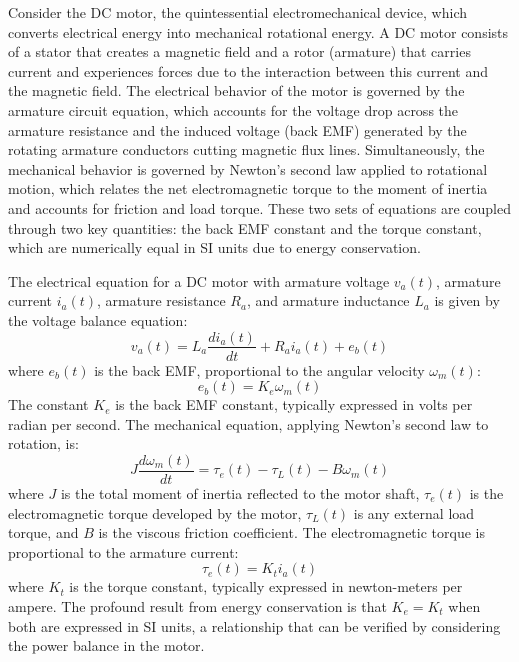 Consider the DC motor, the quintessential electromechanical device, which converts electrical energy into mechanical rotational energy. A DC motor consists of a stator that creates a magnetic field and a rotor (armature) that carries current and experiences forces due to the interaction between this current and the magnetic field. The electrical behavior of the motor is governed by the armature circuit equation, which accounts for the voltage drop across the armature resistance and the induced voltage (back EMF) generated by the rotating armature conductors cutting magnetic flux lines. Simultaneously, the mechanical behavior is governed by Newton's second law applied to rotational motion, which relates the net electromagnetic torque to the moment of inertia and accounts for friction and load torque. These two sets of equations are coupled through two key quantities: the back EMF constant and the torque constant, which are numerically equal in SI units due to energy conservation.

The electrical equation for a DC motor with armature voltage $v_a(t)$, armature current $i_a(t)$, armature resistance $R_a$, and armature inductance $L_a$ is given by the voltage balance equation:
\begin{equation}
v_a(t) = L_a \frac{di_a(t)}{dt} + R_a i_a(t) + e_b(t)
\end{equation}
where $e_b(t)$ is the back EMF, proportional to the angular velocity $\omega_m(t)$:
\begin{equation}
e_b(t) = K_e \omega_m(t)
\end{equation}
The constant $K_e$ is the back EMF constant, typically expressed in volts per radian per second. The mechanical equation, applying Newton's second law to rotation, is:
\begin{equation}
J \frac{d\omega_m(t)}{dt} = \tau_e(t) - \tau_L(t) - B \omega_m(t)
\end{equation}
where $J$ is the total moment of inertia reflected to the motor shaft, $\tau_e(t)$ is the electromagnetic torque developed by the motor, $\tau_L(t)$ is any external load torque, and $B$ is the viscous friction coefficient. The electromagnetic torque is proportional to the armature current:
\begin{equation}
\tau_e(t) = K_t i_a(t)
\end{equation}
where $K_t$ is the torque constant, typically expressed in newton-meters per ampere. The profound result from energy conservation is that $K_e = K_t$ when both are expressed in SI units, a relationship that can be verified by considering the power balance in the motor.

